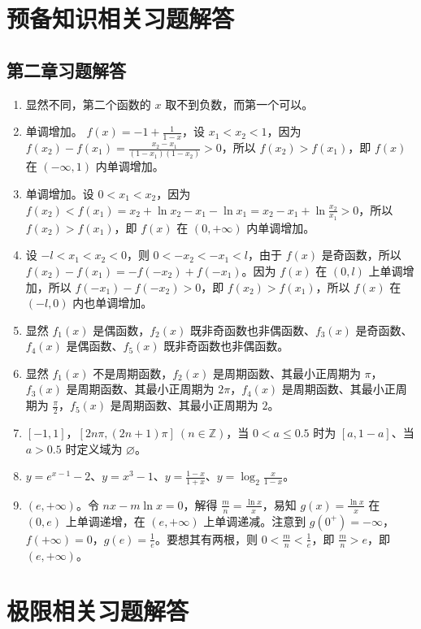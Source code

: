 \documentclass[lang=cn,10pt]{template}
\begin{document}
\section{预备知识相关习题解答}
\subsection{第二章习题解答}
\begin{enumerate}
\item 显然不同，第二个函数的 $x$ 取不到负数，而第一个可以。
\item 单调增加。 $f(x) = -1 + \frac1{1-x}$，设 $x_1 < x_2 < 1$，因为 $f(x_2) - f(x_1) = \frac{x_2-x_1}{(1-x_1)(1-x_2)} > 0$，所以 $f(x_2) > f(x_1)$，即 $f(x)$ 在 $(-\infty, 1)$ 内单调增加。
\item 单调增加。设 $0 < x_1 < x_2$，因为 $f(x_2) < f(x_1) = x_2 + \ln x_2 - x_1 - \ln x_1 = x_2 - x_1 + \ln \frac{x_2}{x_1} > 0$，所以 $f(x_2) > f(x_1)$，即 $f(x)$ 在 $(0, +\infty)$ 内单调增加。
\item 设 $-l < x_1 < x_2 < 0$，则 $0 < -x_2 < -x_1 < l$，由于 $f(x)$ 是奇函数，所以 $f(x_2) - f(x_1) = -f(-x_2) + f(-x_1)$。因为 $f(x)$ 在 $(0, l)$ 上单调增加，所以 $f(-x_1) - f(-x_2) > 0$，即 $f(x_2) > f(x_1)$，所以 $f(x)$ 在 $(-l, 0)$ 内也单调增加。
\item 显然 $f_1(x)$ 是偶函数，$f_2(x)$ 既非奇函数也非偶函数、$f_3(x)$ 是奇函数、$f_4(x)$ 是偶函数、$f_5(x)$ 既非奇函数也非偶函数。
\item 显然 $f_1(x)$ 不是周期函数，$f_2(x)$ 是周期函数、其最小正周期为 $\pi$，$f_3(x)$ 是周期函数、其最小正周期为 $2\pi$，$f_4(x)$ 是周期函数、其最小正周期为 $\frac{\pi}2$，$f_5(x)$ 是周期函数、其最小正周期为 $2$。
\item $[-1, 1]$，$[2n \pi, (2n+1) \pi]\ (n \in \mathbb{Z})$，当 $0 < a \leq 0.5$ 时为 $[a, 1-a]$、当 $a > 0.5$ 时定义域为 $\varnothing$。
\item $y = e^{x-1}-2$、$y=x^3-1$、$y=\frac{1-x}{1+x}$、$y = \log_2 \frac{x}{1-x}$。
\item $(e, +\infty)$。令 $nx - m \ln x = 0$，解得 $\frac m n = \frac{\ln x}x$，易知 $g(x) = \frac{\ln x}{x}$ 在 $(0, e)$ 上单调递增，在 $(e, +\infty)$ 上单调递减。注意到 $g(0^+) = -\infty$，$f(+\infty) = 0$，$g(e) = \frac 1e$。要想其有两根，则 $0 < \frac m n < \frac 1e$，即 $\frac m n > e$，即 $(e, +\infty)$。
\end{enumerate}

\section{极限相关习题解答}
\end{document}
